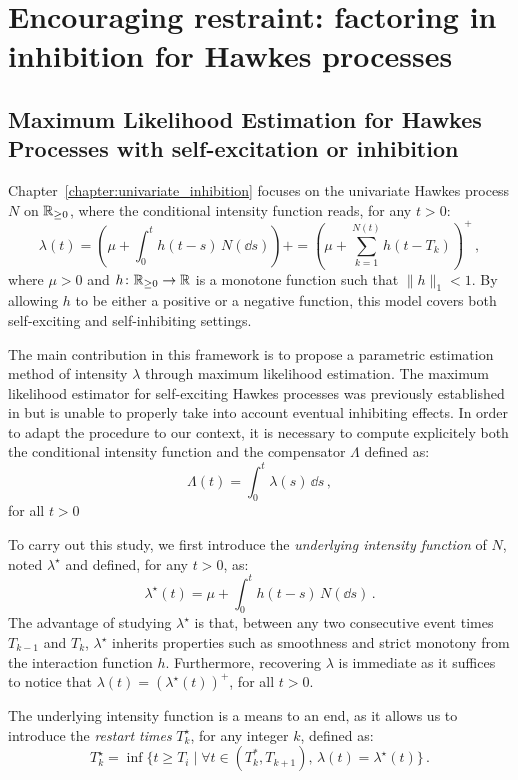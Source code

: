 \section{Encouraging restraint: factoring in inhibition for Hawkes processes}\label{sec:chap0_inhibition}
    \subsection{Maximum Likelihood Estimation for Hawkes Processes with self-excitation or inhibition}
        Chapter~\ref{chapter:univariate_inhibition} focuses on the univariate Hawkes process $N$ on ${\mathbb R}_{\geq0}$, where the conditional intensity function reads, for any $t>0$:
        \[\lambda(t) = \left(\mu + \int_{0}^{t}{h(t-s)\,N(\dd s)}\right)+ = \left(\mu + \sum_{k=1}^{N(t)}{h(t - T_k)}\right)^+\,,\]
        where $\mu > 0$ and $h\colon {\mathbb R}_{\geq 0} \to {\mathbb R}$ is a monotone function such that $\|h\|_1 < 1$. 
        By allowing $h$ to be either a positive or a negative function, this model covers both self-exciting and self-inhibiting settings.

        The main contribution in this framework is to propose a parametric estimation method of intensity $\lambda$ through maximum likelihood estimation. 
        The maximum likelihood estimator for self-exciting Hawkes processes was previously established in \textcite{Ozaki1979} but is unable to properly take into account eventual inhibiting effects. 
        In order to adapt the procedure to our context, it is necessary to compute explicitely both the conditional intensity function and the compensator $\Lambda$ defined as:
        \[\Lambda(t) = \int_{0}^{t}{\lambda(s)\,\dd s}\,,\]
        for all $t>0$

        To carry out this study, we first introduce the \textit{underlying intensity function} of $N$, noted $\lambda^\star$ and defined, for any $t>0$, as:
        \[\lambda^\star(t) = \mu + \int_{0}^{t}{h(t-s)\,N(\dd s)}\,.\]
        The advantage of studying $\lambda^\star$ is that, between any two consecutive event times $T_{k-1}$ and $T_k$, $\lambda^\star$ inherits properties such as smoothness and strict monotony from the interaction function $h$.
        Furthermore, recovering $\lambda$ is immediate as it suffices to notice that $\lambda(t) = \left(\lambda^\star(t)\right)^+$, for all $t>0$. 

        The underlying intensity function is a means to an end, as it allows us to introduce the \textit{restart times} $T_k^\star$, for any integer $k$, defined as:
        \[T_k^\star = \inf{\{t\geq T_i\mid \forall t\in(T_k^*,T_{k+1}),\, \lambda(t) = \lambda^\star(t)\}}\,.\]

